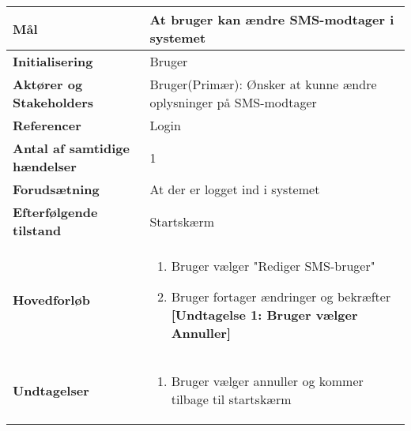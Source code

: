 \begin{table}[H] \centering
\begin{tabular}{|p{6cm}|p{8cm}|}
	\hline
\textbf{Mål} &
At bruger kan ændre SMS-modtager i systemet\\\hline

\textbf{Initialisering} &
  Bruger \\\hline
 
\textbf{Aktører og Stakeholders} &
Bruger(Primær): Ønsker at kunne ændre oplysninger på SMS-modtager  \\\hline

\textbf{Referencer} &
Login  \\\hline

\textbf{Antal af samtidige hændelser} &
1  \\\hline

\textbf{Forudsætning} &
At der er logget ind i systemet  \\\hline

\textbf{Efterfølgende tilstand} &
Startskærm  \\\hline

\textbf{Hovedforløb} &
\begin{enumerate}

\item Bruger vælger "Rediger SMS-bruger"
\item Bruger fortager ændringer og bekræfter \newline
\textbf{[Undtagelse 1: Bruger vælger Annuller]}

\end{enumerate}   
 \\\hline
 
\textbf{Undtagelser}
&\begin{enumerate}[label= \ref{UC8und1}a.]
\item Bruger vælger annuller og kommer tilbage til startskærm
\end{enumerate}
 \\\hline
 

	\end{tabular}
	\label{UC6} 
\end{table}